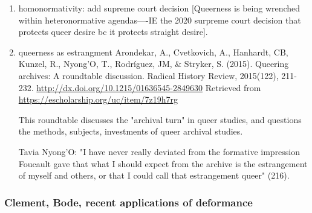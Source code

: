 \documentclass[11pt]{article}
\begin{document}
\begin{enumerate}
\item homonormativity: add supreme court decision
\label{sec:org60ee219}
[Queerness is being wrenched within heteronormative agendas----IE the
2020 surpreme court decision that protects queer desire bc it protects
straight desire].

\item queerness as estrangment
\label{sec:orgf23d180}
Arondekar, A., Cvetkovich, A., Hanhardt, CB, Kunzel, R., Nyong’O, T.,
Rodríguez, JM, \& Stryker, S. (2015). Queering archives: A roundtable
discussion. Radical History Review, 2015(122),
211-232. \url{http://dx.doi.org/10.1215/01636545-2849630} Retrieved from
\url{https://escholarship.org/uc/item/7z19h7rg}

This roundtable discusses the "archival turn" in queer studies, and
questions the methods, subjects, investments of queer archival
studies. 

Tavia Nyong'O: "I have never really deviated from the formative
impression Foucault gave that what I should expect from the archive is
the estrangement of myself and others, or that I could call that
estrangement queer" (216).
\end{enumerate}

\subsubsection{Clement, Bode, recent applications of deformance}
\label{sec:orgc96511f}
\end{document}
